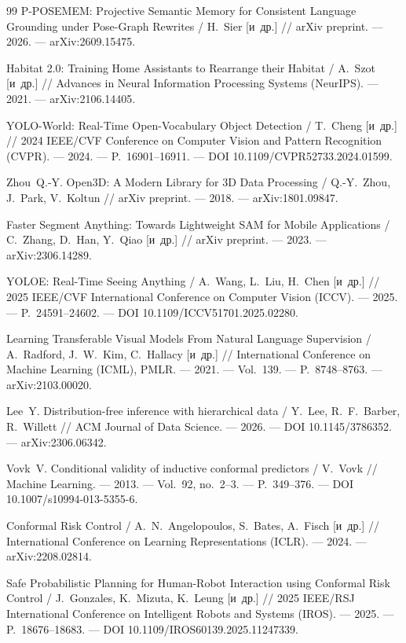 \begin{thebibliography}{99}
 P-POSEMEM: Projective Semantic Memory for Consistent Language Grounding under Pose-Graph Rewrites / H.~Sier [и~др.] // arXiv preprint. --- 2026. --- arXiv:2609.15475.

 Habitat 2.0: Training Home Assistants to Rearrange their Habitat / A.~Szot [и~др.] // Advances in Neural Information Processing Systems (NeurIPS). --- 2021. --- arXiv:2106.14405.

 YOLO-World: Real-Time Open-Vocabulary Object Detection / T.~Cheng [и~др.] // 2024 IEEE/CVF Conference on Computer Vision and Pattern Recognition (CVPR). --- 2024. --- P.~16901--16911. --- DOI 10.1109/CVPR52733.2024.01599.

 Zhou~Q.-Y. Open3D: A Modern Library for 3D Data Processing / Q.-Y.~Zhou, J.~Park, V.~Koltun // arXiv preprint. --- 2018. --- arXiv:1801.09847.

 Faster Segment Anything: Towards Lightweight SAM for Mobile Applications / C.~Zhang, D.~Han, Y.~Qiao [и~др.] // arXiv preprint. --- 2023. --- arXiv:2306.14289.

 YOLOE: Real-Time Seeing Anything / A.~Wang, L.~Liu, H.~Chen [и~др.] // 2025 IEEE/CVF International Conference on Computer Vision (ICCV). --- 2025. --- P.~24591--24602. --- DOI 10.1109/ICCV51701.2025.02280.

 Learning Transferable Visual Models From Natural Language Supervision / A.~Radford, J.~W.~Kim, C.~Hallacy [и~др.] // International Conference on Machine Learning (ICML), PMLR. --- 2021. --- Vol.~139. --- P.~8748--8763. --- arXiv:2103.00020.

 Lee~Y. Distribution-free inference with hierarchical data / Y.~Lee, R.~F.~Barber, R.~Willett // ACM Journal of Data Science. --- 2026. --- DOI 10.1145/3786352. --- arXiv:2306.06342.

 Vovk~V. Conditional validity of inductive conformal predictors / V.~Vovk // Machine Learning. --- 2013. --- Vol.~92, no.~2--3. --- P.~349--376. --- DOI 10.1007/s10994-013-5355-6.

 Conformal Risk Control / A.~N.~Angelopoulos, S.~Bates, A.~Fisch [и~др.] // International Conference on Learning Representations (ICLR). --- 2024. --- arXiv:2208.02814.

 Safe Probabilistic Planning for Human-Robot Interaction using Conformal Risk Control / J.~Gonzales, K.~Mizuta, K.~Leung [и~др.] // 2025 IEEE/RSJ International Conference on Intelligent Robots and Systems (IROS). --- 2025. --- P.~18676--18683. --- DOI 10.1109/IROS60139.2025.11247339.


\end{thebibliography}

